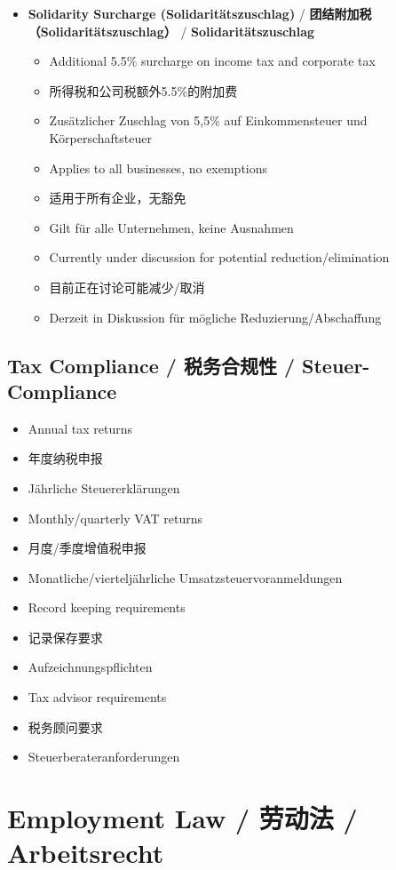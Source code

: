 \begin{itemize}
    \item \textbf{Solidarity Surcharge (Solidaritätszuschlag)} / \textbf{团结附加税（Solidaritätszuschlag）} / \textbf{Solidaritätszuschlag}
    \begin{itemize}
        \item Additional 5.5\% surcharge on income tax and corporate tax
        \item 所得税和公司税额外5.5\%的附加费
        \item Zusätzlicher Zuschlag von 5,5\% auf Einkommensteuer und Körperschaftsteuer
        \item Applies to all businesses, no exemptions
        \item 适用于所有企业，无豁免
        \item Gilt für alle Unternehmen, keine Ausnahmen
        \item Currently under discussion for potential reduction/elimination
        \item 目前正在讨论可能减少/取消
        \item Derzeit in Diskussion für mögliche Reduzierung/Abschaffung
    \end{itemize}
\end{itemize}

\subsection{Tax Compliance / 税务合规性 / Steuer-Compliance}
\begin{itemize}
    \item Annual tax returns
    \item 年度纳税申报
    \item Jährliche Steuererklärungen
    \item Monthly/quarterly VAT returns
    \item 月度/季度增值税申报
    \item Monatliche/vierteljährliche Umsatzsteuervoranmeldungen
    \item Record keeping requirements
    \item 记录保存要求
    \item Aufzeichnungspflichten
    \item Tax advisor requirements
    \item 税务顾问要求
    \item Steuerberateranforderungen
\end{itemize}

\section{Employment Law / 劳动法 / Arbeitsrecht}

